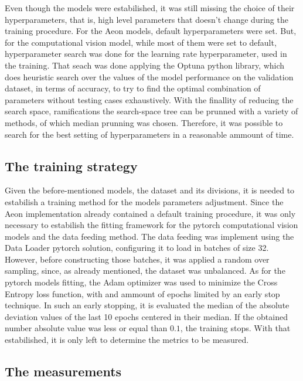 



Even though the models were estabilished, it was still missing the choice of their hyperparameters, that is, high level parameters that doesn't change during the training procedure. For the Aeon models, default hyperparameters were set. But, for the computational vision model, while most of them were set to default, hyperparameter search was done for the learning rate hyperparameter, used in the training. That seach was done applying the Optuna python library, which does heuristic search over the values of the model performance on the validation dataset, in terms of accuracy, to try to find the optimal combination of parameters without testing cases exhaustively. With the finallity of reducing the search space, ramifications the search-space tree can be prunned with a variety of methods, of which median prunning was chosen. Therefore, it was possible to search for the best setting of hyperparameters in a reasonable ammount of time.

\subsection{The training strategy}

Given the before-mentioned models, the dataset and its divisions, it is needed to estabilish a training method for the models parameters adjustment. Since the Aeon implementation already contained a default training procedure, it was only necessary to estabilish the fitting framework for the pytorch computational vision models and the data feeding method. The data feeding was implement using the Data Loader pytorch solution, configuring it to load in batches of size 32. However, before constructing those batches, it was applied a random over sampling, since, as already mentioned, the dataset was unbalanced. As for the pytorch models fitting, the Adam optimizer was used to minimize the Cross Entropy loss function, with and ammount of epochs limited by an early stop technique. In such an early stopping, it is evaluated the median of the absolute deviation values of the last 10 epochs centered in their median. If the obtained number absolute value was less or equal than $0.1$, the training stops. With that estabilished, it is only left to determine the metrics to be measured.     

\subsection{The measurements}


